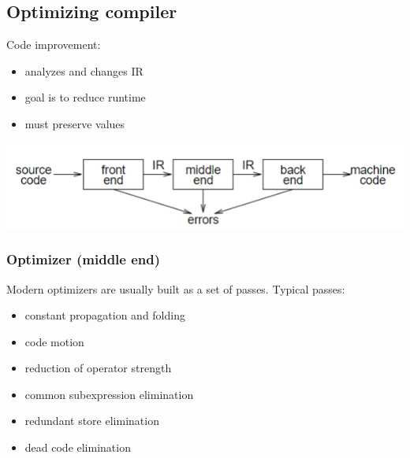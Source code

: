 \documentclass[10pt]{article}
\begin{document}
\subsection*{Optimizing compiler}
Code improvement:
\begin{itemize}
    \item analyzes and changes IR
    \item goal is to reduce runtime
    \item must preserve values
\end{itemize}
\begin{center}
    \includegraphics*[scale=1]{W1_5.png}
\end{center}
\subsubsection*{Optimizer (middle end)}
Modern optimizers are usually built as a set of passes.
Typical passes:
\begin{itemize}
    \item constant propagation and folding
    \item code motion
    \item reduction of operator strength
    \item common subexpression elimination
    \item redundant store elimination
    \item dead code elimination
\end{itemize}
\end{document}
